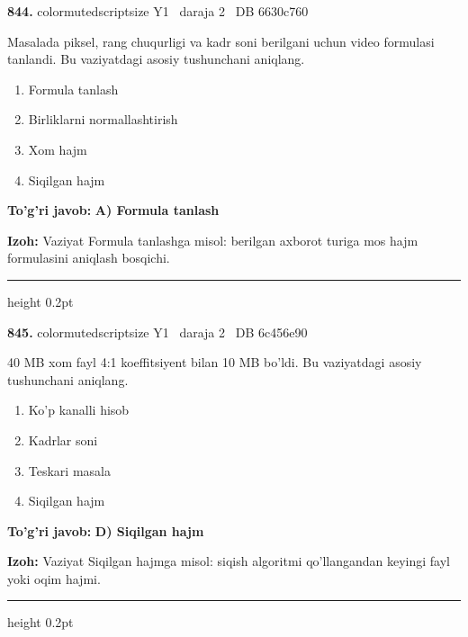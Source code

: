 \documentclass[10pt,a4paper,oneside]{article}
\begin{document}
\noindent\textbf{\color{ink}844.}  {color{muted}scriptsize Y1 \textbullet\ daraja 2 \textbullet\ DB 6630c760}
\par
Masalada piksel, rang chuqurligi va kadr soni berilgani uchun video formulasi tanlandi. Bu vaziyatdagi asosiy tushunchani aniqlang.
\begin{enumerate}[label=\Alph*),leftmargin=9mm]
\item Formula tanlash
\item Birliklarni normallashtirish
\item Xom hajm
\item Siqilgan hajm
\end{enumerate}
\begin{tcolorbox}[enhanced,breakable,colback=teal!4,colframe=teal!50!black,boxrule=0.5pt,arc=1.1mm,left=3mm,right=3mm,top=1.7mm,bottom=1.7mm,before skip=2mm,after skip=2mm]
\textbf{\color{teal}To'g'ri javob:} \textbf{A) Formula tanlash}
\par\smallskip
\textbf{Izoh:} Vaziyat Formula tanlashga misol: berilgan axborot turiga mos hajm formulasini aniqlash bosqichi.
\end{tcolorbox}
\vspace{2mm}\hrule height 0.2pt \vspace{3mm}

\noindent\textbf{\color{ink}845.}  {color{muted}scriptsize Y1 \textbullet\ daraja 2 \textbullet\ DB 6c456e90}
\par
40 MB xom fayl 4:1 koeffitsiyent bilan 10 MB bo'ldi. Bu vaziyatdagi asosiy tushunchani aniqlang.
\begin{enumerate}[label=\Alph*),leftmargin=9mm]
\item Ko'p kanalli hisob
\item Kadrlar soni
\item Teskari masala
\item Siqilgan hajm
\end{enumerate}
\begin{tcolorbox}[enhanced,breakable,colback=teal!4,colframe=teal!50!black,boxrule=0.5pt,arc=1.1mm,left=3mm,right=3mm,top=1.7mm,bottom=1.7mm,before skip=2mm,after skip=2mm]
\textbf{\color{teal}To'g'ri javob:} \textbf{D) Siqilgan hajm}
\par\smallskip
\textbf{Izoh:} Vaziyat Siqilgan hajmga misol: siqish algoritmi qo'llangandan keyingi fayl yoki oqim hajmi.
\end{tcolorbox}
\vspace{2mm}\hrule height 0.2pt \vspace{3mm}
\end{document}

